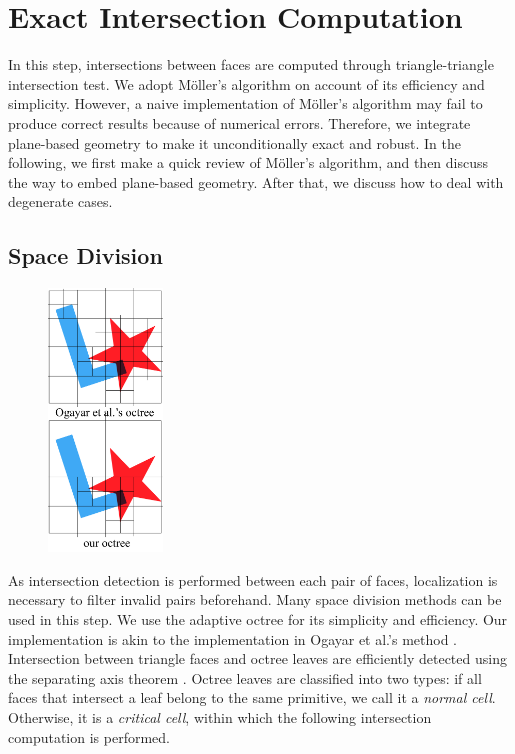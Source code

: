 \documentclass[10pt,journal,compsoc]{IEEEtran}
\begin{document}
\section{Exact Intersection Computation}

\label{section:isect}
In this step, intersections between faces are computed through triangle-triangle intersection test. We adopt M\"{o}ller's algorithm \cite{moller1997fast} on account of its efficiency and simplicity. However, a naive implementation of M\"{o}ller's algorithm may fail to produce correct results because of numerical errors. Therefore, we integrate plane-based geometry to make it unconditionally exact and robust. In the following, we first make a quick review of M\"{o}ller's algorithm, and then discuss the way to embed plane-based geometry. After that, we discuss how to deal with degenerate cases.


\subsection{Space Division}

\begin{figure}
\includegraphics[width=1.2in]{octreediff}
\end{figure}
As intersection detection is performed between each pair of faces, localization is necessary to filter invalid pairs beforehand. Many space division methods can be used in this step. We use the adaptive octree for its simplicity and efficiency. Our implementation is akin to the implementation in Ogayar et al.'s method \cite{ogayar2015deferred}. Intersection between triangle faces and octree leaves are efficiently detected using the separating axis theorem \cite{gottschalk1996obbtree}. Octree leaves are classified into two types: if all faces that intersect a leaf belong to the same primitive, we call it a \emph{normal cell}. Otherwise, it is a \emph{critical cell}, within which the following intersection computation is performed.
\end{document}
